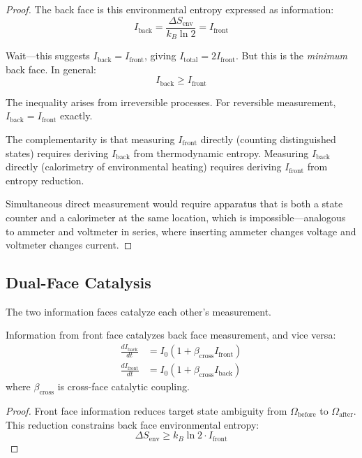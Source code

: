 \begin{theorem}
\begin{proof}
The back face is this environmental entropy expressed as information:
\begin{equation}
I_{\text{back}} = \frac{\Delta S_{\text{env}}}{k_B \ln 2} = I_{\text{front}}
\end{equation}

Wait—this suggests $I_{\text{back}} = I_{\text{front}}$, giving $I_{\text{total}} = 2I_{\text{front}}$. But this is the \textit{minimum} back face. In general:
\begin{equation}
I_{\text{back}} \geq I_{\text{front}}
\end{equation}

The inequality arises from irreversible processes. For reversible measurement, $I_{\text{back}} = I_{\text{front}}$ exactly.

The complementarity is that measuring $I_{\text{front}}$ directly (counting distinguished states) requires deriving $I_{\text{back}}$ from thermodynamic entropy. Measuring $I_{\text{back}}$ directly (calorimetry of environmental heating) requires deriving $I_{\text{front}}$ from entropy reduction.

Simultaneous direct measurement would require apparatus that is both a state counter and a calorimeter at the same location, which is impossible—analogous to ammeter and voltmeter in series, where inserting ammeter changes voltage and voltmeter changes current.
\end{proof}

\subsection{Dual-Face Catalysis}

The two information faces catalyze each other's measurement.

\begin{theorem}
\label{thm:cross_face_catalysis}
Information from front face catalyzes back face measurement, and vice versa:
\begin{align}
\frac{dI_{\text{back}}}{dt} &= I_0(1 + \beta_{\text{cross}} I_{\text{front}}) \\
\frac{dI_{\text{front}}}{dt} &= I_0(1 + \beta_{\text{cross}} I_{\text{back}})
\end{align}
where $\beta_{\text{cross}}$ is cross-face catalytic coupling.
\end{theorem}

\begin{proof}
Front face information reduces target state ambiguity from $\Omega_{\text{before}}$ to $\Omega_{\text{after}}$. This reduction constrains back face environmental entropy:
\begin{equation}
\Delta S_{\text{env}} \geq k_B \ln 2 \cdot I_{\text{front}}
\end{equation}


\end{proof}
\end{theorem}
